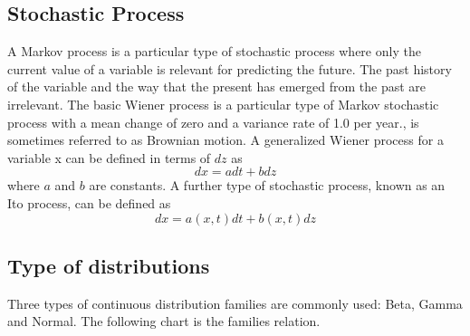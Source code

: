 \documentclass[UTF8]{article} %
\begin{document}
\subsection{Stochastic Process}
A Markov process is a particular type of stochastic process where only the current value of a variable is relevant for predicting the future. The past history of the variable and the way that the present has emerged from the past are irrelevant. 
The basic Wiener process is a particular type of Markov stochastic process with a mean change of zero and a variance rate of 1.0 per year., is sometimes referred to as Brownian motion. 
A generalized Wiener process for a variable x can be defined in terms of $dz$ as 
$$
dx=adt+bdz
$$
where $a$ and $b$ are constants.
A further type of stochastic process, known as an Ito process, can be defined as
$$
dx=a(x,t)dt+b(x,t)dz
$$

\subsection{Type of distributions}
Three types of continuous distribution families are commonly used:  Beta, Gamma and Normal. The following chart is the families relation.
\thispagestyle{empty}
\end{document}
